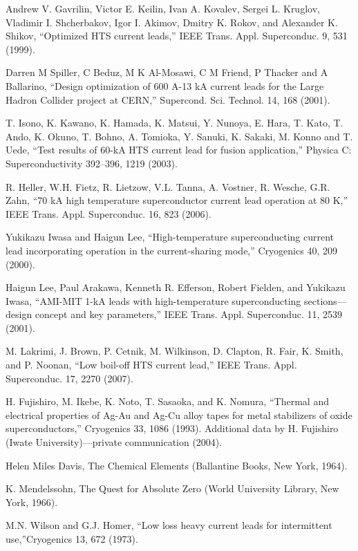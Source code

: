 \noindent [4.71] Andrew V. Gavrilin, Victor E. Keilin, Ivan A. Kovalev, Sergei L. Kruglov, Vladimir I. Shcherbakov, Igor I. Akimov, Dmitry K. Rokov, and Alexander K. Shikov, ``Optimized HTS current leads,” IEEE Trans. Appl. Superconduc. 9, 531 (1999).

\noindent [4.72] Darren M Spiller, C Beduz, M K Al-Mosawi, C M Friend, P Thacker and A Ballarino, ``Design optimization of 600 A-13 kA current leads for the Large Hadron
Collider project at CERN,” Supercond. Sci. Technol. 14, 168 (2001).

\noindent [4.73] T. Isono, K. Kawano, K. Hamada, K. Matsui, Y. Nunoya, E. Hara, T. Kato,
T. Ando, K. Okuno, T. Bohno, A. Tomioka, Y. Sanuki, K. Sakaki, M. Konno and
T. Uede, ``Test results of 60-kA HTS current lead for fusion application,” Physica
C: Superconductivity 392–396, 1219 (2003).

\noindent [4.74] R. Heller, W.H. Fietz, R. Lietzow, V.L. Tanna, A. Vostner, R. Wesche, G.R. Zahn,
``70 kA high temperature superconductor current lead operation at 80 K,” IEEE
Trans. Appl. Superconduc. 16, 823 (2006).

\noindent [4.75] Yukikazu Iwasa and Haigun Lee, ``High-temperature superconducting current lead incorporating operation in the current-sharing mode,” Cryogenics 40, 209 (2000).

\noindent [4.76] Haigun Lee, Paul Arakawa, Kenneth R. Efferson, Robert Fielden, and Yukikazu
Iwasa, ``AMI-MIT 1-kA leads with high-temperature superconducting sections—
design concept and key parameters,” IEEE Trans. Appl. Superconduc. 11, 2539
(2001).

\noindent [4.77] M. Lakrimi, J. Brown, P. Cetnik, M. Wilkinson, D. Clapton, R. Fair, K. Smith,
and P. Noonan, ``Low boil-off HTS current lead,” IEEE Trans. Appl. Superconduc.
17, 2270 (2007).

\noindent [4.78] H. Fujishiro, M. Ikebe, K. Noto, T. Sasaoka, and K. Nomura, ``Thermal and electrical properties of Ag-Au and Ag-Cu alloy tapes for metal stabilizers of oxide
superconductors,” Cryogenics 33, 1086 (1993). Additional data by H. Fujishiro
(Iwate University)---private communication (2004).

\noindent [4.79] Helen Miles Davis, The Chemical Elements (Ballantine Books, New York, 1964).

\noindent [4.80] K. Mendelssohn, The Quest for Absolute Zero (World University Library, New
York, 1966).

\noindent [4.81] M.N. Wilson and G.J. Homer, ``Low loss heavy current leads for intermittent use,”Cryogenics 13, 672 (1973).

